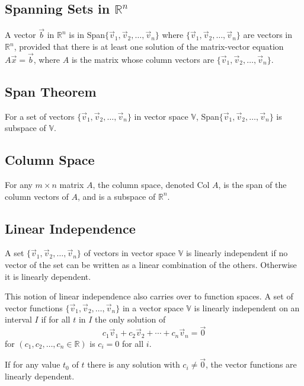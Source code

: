     \subsection{Spanning Sets in $\mathbb{R}^n$}
    A vector $\vec{b}$ in $\mathbb{R}^n$ is in Span$\{\vec{v}_1, \vec{v}_2, \ldots, \vec{v}_n\}$ where $\{\vec{v}_1, \vec{v}_2, \ldots, \vec{v}_n\}$ are vectors in $\mathbb{R}^n$, provided that there is at least one solution of the matrix-vector equation $A\vec{x} = \vec{b}$, where $A$ is the matrix whose column vectors are $\{\vec{v}_1, \vec{v}_2, \ldots, \vec{v}_n\}$.

    \subsection{Span Theorem}
    For a set of vectors $\{\vec{v}_1, \vec{v}_2, \ldots, \vec{v}_n\}$ in vector space $\mathbb{V}$, Span$\{\vec{v}_1, \vec{v}_2, \ldots, \vec{v}_n\}$ is subspace of $\mathbb{V}$.

    \subsection{Column Space}
    For any $m \times n$ matrix $A$, the column space, denoted Col $A$, is the span of the column vectors of $A$, and is a subspace of $\mathbb{R}^n$.

    \subsection{Linear Independence}
    A set $\{\vec{v}_1, \vec{v}_2, \ldots, \vec{v}_n\}$ of vectors in vector space $\mathbb{V}$ is linearly independent if no vector of the set can be written as a linear combination of the others. Otherwise it is linearly dependent.

    This notion of linear independence also carries over to function spaces. A set of vector functions $\{\vec{v}_1, \vec{v}_2, \ldots, \vec{v}_n\}$ in a vector space $\mathbb{V}$ is linearly independent on an interval $I$ if for all $t$ in $I$ the only solution of
    \[
    c_1 \vec{v}_1 + c_2 \vec{v}_2 + \cdots + c_n \vec{v}_n = \vec{0}
    \]
    for $(c_1, c_2, \ldots, c_n \in \mathbb{R})$ is $c_i = 0$ for all $i$.

    If for any value $t_0$ of $t$ there is any solution with $c_i \neq \vec{0}$, the vector functions are linearly dependent.

